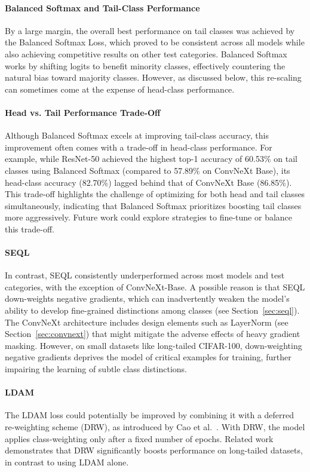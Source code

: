 \paragraph{Balanced Softmax and Tail-Class Performance}
By a large margin, the overall best performance on tail classes was achieved by the Balanced Softmax Loss, which proved to be consistent across all models while also achieving competitive results on other test categories. Balanced Softmax works by shifting logits to benefit minority classes, effectively countering the natural bias toward majority classes. However, as discussed below, this re-scaling can sometimes come at the expense of head-class performance.

\paragraph{Head vs. Tail Performance Trade-Off}
Although Balanced Softmax excels at improving tail-class accuracy, this improvement often comes with a trade-off in head-class performance. For example, while ResNet-50 achieved the highest top-1 accuracy of 60.53\% on tail classes using Balanced Softmax (compared to 57.89\% on ConvNeXt Base), its head-class accuracy (82.70\%) lagged behind that of ConvNeXt Base (86.85\%). This trade-off highlights the challenge of optimizing for both head and tail classes simultaneously, indicating that Balanced Softmax prioritizes boosting tail classes more aggressively. Future work could explore strategies to fine-tune or balance this trade-off.


\paragraph{SEQL}
In contrast, SEQL consistently underperformed across most models and test categories, with the exception of ConvNeXt-Base. A possible reason is that SEQL down-weights negative gradients, which can inadvertently weaken the model's ability to develop fine-grained distinctions among classes (see Section~\ref{sec:seql}). The ConvNeXt architecture includes design elements such as LayerNorm (see Section~\ref{sec:convnext}) that might mitigate the adverse effects of heavy gradient masking. However, on small datasets like long-tailed CIFAR-100, down-weighting negative gradients deprives the model of critical examples for training, further impairing the learning of subtle class distinctions.

\paragraph{LDAM}
The LDAM loss could potentially be improved by combining it with a deferred re-weighting scheme (DRW), as introduced by Cao et al.~\cite{cao2019learningimbalanceddatasetslabeldistributionaware}. With DRW, the model applies class-weighting only after a fixed number of epochs. Related work~\cite{menon2021longtaillearninglogitadjustment} demonstrates that DRW significantly boosts performance on long-tailed datasets, in contrast to using LDAM alone.

